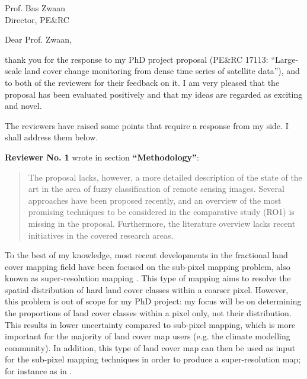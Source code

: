 \documentclass[a4paper,10pt,backaddress=false]{scrartcl}
\begin{document}
\begin{letter}{Prof. Bas Zwaan \\ Director, PE\&RC}
\opening{Dear Prof. Zwaan,}

thank you for the response to my PhD project proposal (PE\&RC 17113: ``Large-scale land cover change monitoring from dense time series of satellite data''), and to both of the reviewers for their feedback on it. I am very pleased that the proposal has been evaluated positively and that my ideas are regarded as exciting and novel.

The reviewers have raised some points that require a response from my side. I shall address them below.

\bigskip

\textbf{Reviewer No. 1} wrote in section \textbf{``Methodology''}:

\blockquote{The proposal lacks, however, a more detailed description of the state of the art in the area of fuzzy classification of remote sensing images. Several approaches have been proposed recently, and an overview of the most promising techniques to be considered in the comparative study (RO1) is missing in the proposal. Furthermore, the literature overview lacks recent initiatives in the covered research areas.}

To the best of my knowledge, most recent developments in the fractional land cover mapping field have been focused on the sub-pixel mapping problem, also known as super-resolution mapping \citep{mertens_using_2003, thornton_subpixel_2006, ling_super-resolution_2010, wang_particle_2012, ge_sub-pixel_2013, wang_subpixel_2013, wang_allocating_2014, xu_adaptive_2014, xu_spatio-temporal_2014, zhang_example-based_2014, wang_indicator_2015}. This type of mapping aims to resolve the spatial distribution of hard land cover classes within a coarser pixel. However, this problem is out of scope for my PhD project: my focus will be on determining the proportions of land cover classes within a pixel only, not their distribution. This results in lower uncertainty compared to sub-pixel mapping, which is more important for the majority of land cover map users (e.g. the climate modelling community). In addition, this type of land cover map can then be used as input for the sub-pixel mapping techniques in order to produce a super-resolution map; for instance as in \citet{wang_allocating_2014}.


\end{letter}
\end{document}
